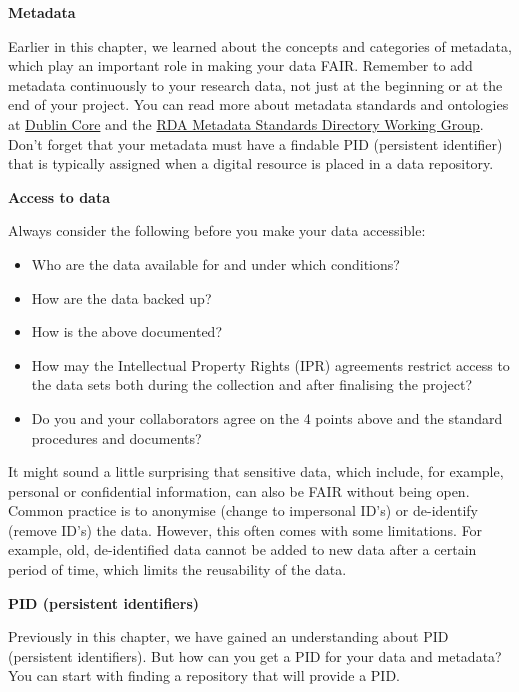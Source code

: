 \documentclass[
]{book}
\begin{document}
\textbf{Metadata}

Earlier in this chapter, we learned about the concepts and categories of metadata, which play an important role in making your data FAIR. Remember to add metadata continuously to your research data, not just at the beginning or at the end of your project. You can read more about metadata standards and ontologies at \href{https://www.dublincore.org/}{Dublin Core} and the \href{http://rd-alliance.github.io/metadata-directory/}{RDA Metadata Standards Directory Working Group}. Don't forget that your metadata must have a findable PID (persistent identifier) that is typically assigned when a digital resource is placed in a data repository.

\textbf{Access to data}

Always consider the following before you make your data accessible:

\begin{itemize}
\item
  Who are the data available for and under which conditions?
\item
  How are the data backed up?
\item
  How is the above documented?
\item
  How may the Intellectual Property Rights (IPR) agreements restrict access to the data sets both during the collection and after finalising the project?
\item
  Do you and your collaborators agree on the 4 points above and the standard procedures and documents?
\end{itemize}

It might sound a little surprising that sensitive data, which include, for example, personal or confidential information, can also be FAIR without being open. Common practice is to anonymise (change to impersonal ID's) or de-identify (remove ID's) the data. However, this often comes with some limitations. For example, old, de-identified data cannot be added to new data after a certain period of time, which limits the reusability of the data.

\textbf{PID (persistent identifiers)}

Previously in this chapter, we have gained an understanding about PID (persistent identifiers). But how can you get a PID for your data and metadata? You can start with finding a repository that will provide a PID.
\end{document}
